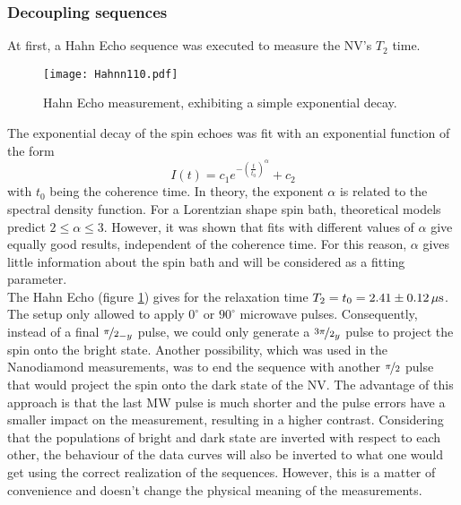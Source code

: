 \documentclass[12pt,a4paper]{article}
\begin{document}
\subsubsection{Decoupling sequences}
At first, a Hahn Echo sequence was executed to measure the NV's $T_2$ time.
\begin{figure}[H]
\texttt{[image: Hahnn110.pdf]} 
\caption{Hahn Echo measurement, exhibiting a simple exponential decay.}
\label{H1}
\end{figure}
The exponential decay of the spin echoes was fit with an exponential function of the form
\begin{equation}\label{exp}
I(t)=c_1e^{-\left(\frac{t}{t_0}\right)^\alpha}+c_2
\end{equation}
with $t_0$ being the coherence time. In theory, the exponent $\alpha$ is related to the spectral density function. For a Lorentzian shape spin bath, theoretical models predict $2\leq\alpha\leq3$\cite{ess}. However, it was shown that fits with different values of $\alpha$ give equally good results, independent of the coherence time\cite{sdd}. For this reason, $\alpha$ gives little information about the spin bath and will be considered as a fitting parameter. \\
The Hahn Echo (figure \ref{H1}) gives for the relaxation time $T_2=t_0=\unit[2.41\pm 0.12]{\mu s}$. 
\\
The setup only allowed to apply $0^\circ$ or $90^\circ$ microwave pulses. Consequently, instead of a final $\nicefrac{\pi}{2}_{-y}$ pulse, we could only generate a $\nicefrac{3\pi}{2}_y$ pulse to project the spin onto the bright state. Another possibility, which was used in the Nanodiamond measurements, was to end the sequence with another $\nicefrac{\pi}{2}$ pulse that would project the spin onto the dark state of the NV. The advantage of this approach is that the last MW pulse is much shorter and the pulse errors have a smaller impact on the measurement, resulting in a higher contrast. Considering that the populations of bright and dark state are inverted with respect to each other, the behaviour of the data curves will also be inverted to what one would get using the correct realization of the sequences. However, this is a matter of convenience and doesn't change the physical meaning of the measurements.
\end{document}
